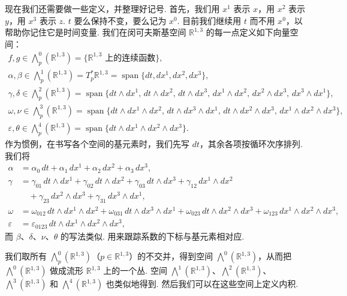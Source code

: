 现在我们还需要做一些定义，并整理好记号. 首先，我们用 $x^1$ 表示 $x$，用 $x^2$ 表示 $y$，用 $x^3$ 表示 $z$. $t$ 要么保持不变，要么记为 $x^0$. 目前我们继续用 $t$ 而不用 $x^0$，以帮助你记住它是时间变量. 我们在闵可夫斯基空间 $\mathbb{R}^{1,3}$ 的每一点定义如下向量空间：
\begin{align*}
f,g\in\bigwedge_p^0(\mathbb{R}^{1,3})=\{\mathbb{R}^{1,3}\text{ 上的连续函数}\}, \\
\alpha,\beta\in\bigwedge_p^1(\mathbb{R}^{1,3})=T_p^*\mathbb{R}^{1,3}=\operatorname{span}\{dt,dx^1,dx^2,dx^3\}, \\
\gamma,\delta\in\bigwedge_p^2(\mathbb{R}^{1,3})=\operatorname{span}\{dt\wedge dx^1,\,dt\wedge dx^2,\,dt\wedge dx^3,\,dx^1\wedge dx^2,\,dx^2\wedge dx^3,\,dx^3\wedge dx^1\}, \\
\omega,\nu\in\bigwedge_p^3(\mathbb{R}^{1,3})=\operatorname{span}\{dt\wedge dx^1\wedge dx^2,\,dt\wedge dx^3\wedge dx^1,\,dt\wedge dx^2\wedge dx^3,\,dx^1\wedge dx^2\wedge dx^3\}, \\
\varepsilon,\theta\in\bigwedge_p^4(\mathbb{R}^{1,3})=\operatorname{span}\{dt\wedge dx^1\wedge dx^2\wedge dx^3\}.
\end{align*}
作为惯例，在书写各个空间的基元素时，我们先写 $dt$，其余各项按循环次序排列. 我们将
\begin{align*}
\alpha & =\alpha_0\,dt+\alpha_1\,dx^1+\alpha_2\,dx^2+\alpha_3\,dx^3, \\
\gamma & =\gamma_{01}\,dt\wedge dx^1+\gamma_{02}\,dt\wedge dx^2+\gamma_{03}\,dt\wedge dx^3
+\gamma_{12}\,dx^1\wedge dx^2 \\
& \quad +\gamma_{23}\,dx^2\wedge dx^3+\gamma_{31}\,dx^3\wedge dx^1, \\
\omega & =\omega_{012}\,dt\wedge dx^1\wedge dx^2+\omega_{031}\,dt\wedge dx^3\wedge dx^1+\omega_{023}\,dt\wedge dx^2\wedge dx^3+\omega_{123}\,dx^1\wedge dx^2\wedge dx^3, \\
\varepsilon & =\varepsilon_{0123}\,dt\wedge dx^1\wedge dx^2\wedge dx^3,
\end{align*}
而 $\beta$、$\delta$、$\nu$、$\theta$ 的写法类似. 用来跟踪系数的下标与基元素相对应.

我们取所有 $\bigwedge_p^0(\mathbb{R}^{1,3})$（$p\in\mathbb{R}^{1,3}$）的不交并，得到空间 $\bigwedge^0(\mathbb{R}^{1,3})$，从而把 $\bigwedge^0(\mathbb{R}^{1,3})$ 做成流形 $\mathbb{R}^{1,3}$ 上的一个丛. 空间 $\bigwedge^1(\mathbb{R}^{1,3})$、$\bigwedge^2(\mathbb{R}^{1,3})$、$\bigwedge^3(\mathbb{R}^{1,3})$ 和 $\bigwedge^4(\mathbb{R}^{1,3})$ 也类似地得到. 然后我们可以在这些空间上定义内积.

